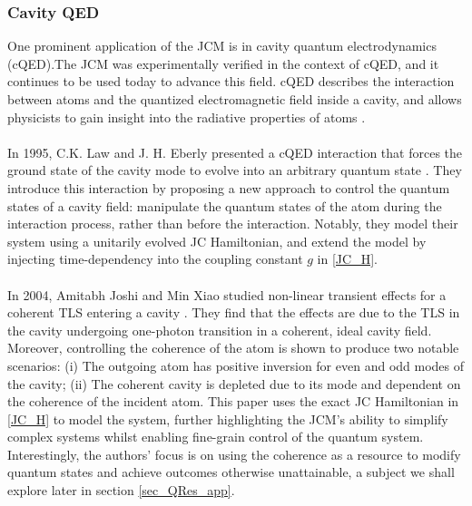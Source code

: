 \documentclass[12pt,a4paper]{article}
\begin{document}
\subsubsection{Cavity QED} \label{subsubsec_cQED}



One prominent application of the JCM is in cavity quantum electrodynamics (cQED).The JCM was experimentally verified in the context of cQED, and it continues to be used today to advance this field. cQED describes the interaction between atoms and the quantized electromagnetic field inside a cavity, and allows physicists to gain insight into the radiative properties of atoms \cite{General2024-JC_overview}.\\
\\
In 1995, C.K. Law and J. H. Eberly presented a cQED interaction that forces the ground state of the cavity mode to evolve into an arbitrary quantum state \cite{Context1996-CQED_JCM}. They introduce this interaction by proposing a new approach to control the quantum states of a cavity field: manipulate the quantum states of the atom during the interaction process, rather than before the interaction. Notably, they model their system using a unitarily evolved JC Hamiltonian, and extend the model by injecting time-dependency into the coupling constant $g$ in \eqref{JC_H}.\\
\\
In 2004, Amitabh Joshi and Min Xiao studied non-linear transient effects for a coherent TLS entering a cavity \cite{QResJCm2004-cQED_coherence}. They find that the effects are due to the TLS in the cavity undergoing one-photon transition in a coherent, ideal cavity field. Moreover, controlling the coherence of the atom is shown to produce two notable scenarios: (i) The outgoing atom has positive inversion for even and odd modes of the cavity; (ii) The coherent cavity is depleted due to its mode and dependent on the coherence of the incident atom. This paper uses the exact JC Hamiltonian in \eqref{JC_H} to model the system, further highlighting the JCM's ability to simplify complex systems whilst enabling fine-grain control of the quantum system. Interestingly, the authors' focus is on using the coherence as a resource to modify quantum states and achieve outcomes otherwise unattainable, a subject we shall explore later in section \ref{sec_QRes_app}.\\
\\
\end{document}
